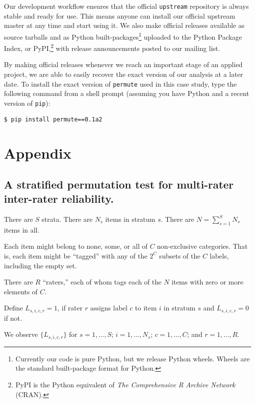 \documentclass[]{article}
\begin{document}
Our development workflow ensures that the official \texttt{upstream} repository
is always stable and ready for use.
This means anyone can install our official upstream master at any time
and start using it.
We also make official releases available as source tarballs and as Python
built-packages\footnote{
   Currently our code is pure Python, but we release Python wheels.
   Wheels are the standard built-package format for Python.
} uploaded to the
Python Package Index, or PyPI,\footnote{
   PyPI is the Python equivalent of \emph{The
   Comprehensive R Archive Network} (CRAN).
} with release announcements posted to our mailing list.

By making official releases whenever we reach an important stage of an
applied project, we are able to easily recover the exact version of our
analysis at a later date.
To install the exact version of \texttt{permute} used in this case study, type
the following command from a shell prompt (assuming you have Python and a
recent version of \texttt{pip}):
\begin{verbatim}
$ pip install permute==0.1a2
\end{verbatim}




\pagebreak

\section*{Appendix}

\subsection*{A stratified permutation test for multi-rater inter-rater reliability.}

There are $S$ strata.
There are $N_s$ items in stratum $s$.
There are $N = \sum_{s=1}^S N_s$ items in all.

Each item might belong to none, some, or all of $C$ non-exclusive categories.
That is, each item might be ``tagged'' with any of the $2^C$ subsets
of the $C$ labels, including the empty set.

There are $R$ ``raters,'' each of whom tags each of the $N$ items with zero
or more elements of $C$.

Define $L_{s,i,c,r} = 1$, if rater $r$ assigns label $c$ to item $i$ in stratum
$s$ and $L_{s,i,c,r} = 0$ if not.

We observe $\{ L_{s,i,c,r} \}$ for $s=1, \dots, S$;  $i=1, \dots, N_s$;
$c=1, \dots, C$; and $r=1, \dots, R$.
\end{document}
